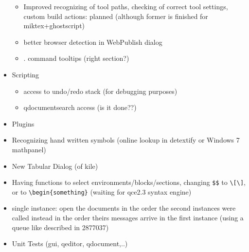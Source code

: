 \documentclass[10pt,a4paper,portrait]{article}
\begin{document}
\begin{itemize}
\begin{itemize}
		\item Improved recognizing of tool paths, checking of correct tool settings,  custom build actions: planned (although former is finished for miktex+ghostscript)
		\item better browser detection in WebPublish dialog 
		\item . command tooltips (right section?)
	\end{itemize}
	\item  Scripting
	\begin{itemize}
	\item access to undo/redo stack (for debugging purposes)
	\item qdocumentsearch access (is it done??)
	\end{itemize}
	\item Plugins
	\item Recognizing hand written symbols (online lookup in detextify or Windows 7 mathpanel)
	\item New Tabular Dialog (of kile)
	\item Having functions to select environments/blocks/sections, changing \verb+$$+ to \verb+\[\]+, or to \verb+\begin{something}+ (waiting for qce2.3 syntax engine)
	\item single instance: open the documents in the order the second instances were called instead in the order theirs messages arrive in the first instance (using a queue like described in 2877037)
	\item Unit Tests (gui, qeditor, qdocument,..)
\end{itemize}
\end{document}

